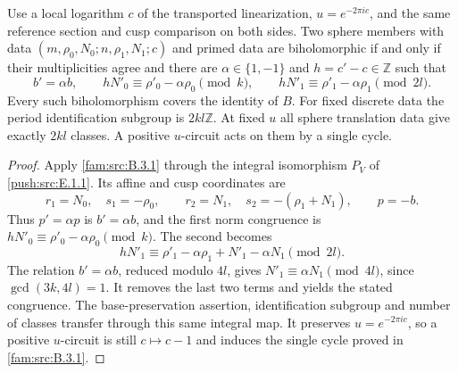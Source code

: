 \begin{theorem}\hypertarget{tag-032S}{}\label{push:src:E.1.2}

Use a local logarithm $c$ of the transported linearization,
$u=e^{-2\pi i c}$, and the same reference section and cusp comparison
on both sides.  Two sphere members with data
$(m,\rho_0,N_0;n,\rho_1,N_1;c)$ and primed data are biholomorphic
if and only if their multiplicities agree and there are
$\alpha\in\{1,-1\}$ and $h=c'-c\in\mathbb Z$ such that
\[
 b'=\alpha b,\qquad
 hN'_0\equiv\rho'_0-\alpha\rho_0\pmod{k},\qquad
 hN'_1\equiv\rho'_1-\alpha\rho_1\pmod{2l}.
\]
Every such biholomorphism covers the identity of $B$.
For fixed discrete data the period identification subgroup is
$2kl\mathbb Z$.  At fixed $u$ all sphere translation data give
exactly $2kl$ classes.  A positive $u$-circuit acts on them by a
single cycle.
\end{theorem}


\begin{proof}
Apply \cref{fam:src:B.3.1} through the integral isomorphism
$P_V$ of \cref{push:src:E.1.1}. Its affine and cusp coordinates are
\[
 r_1=N_0,\quad s_1=-\rho_0,\qquad
 r_2=N_1,\quad s_2=-(\rho_1+N_1),\qquad p=-b.
\]
Thus $p'=\alpha p$ is $b'=\alpha b$, and the first norm congruence is
$hN'_0\equiv\rho'_0-\alpha\rho_0\pmod{k}$.
The second becomes
\[
 hN'_1\equiv\rho'_1-\alpha\rho_1+N'_1-\alpha N_1\pmod{2l}.
\]
The relation $b'=\alpha b$, reduced modulo $4l$, gives
$N'_1\equiv\alpha N_1\pmod{4l}$, since $\gcd(3k,4l)=1$.
It removes the last two terms and yields the stated congruence.
The base-preservation assertion, identification subgroup and number of
classes transfer through this same integral map. It preserves
$u=e^{-2\pi ic}$, so a positive $u$-circuit is still $c\mapsto c-1$
and induces the single cycle proved in \cref{fam:src:B.3.1}.
\end{proof}